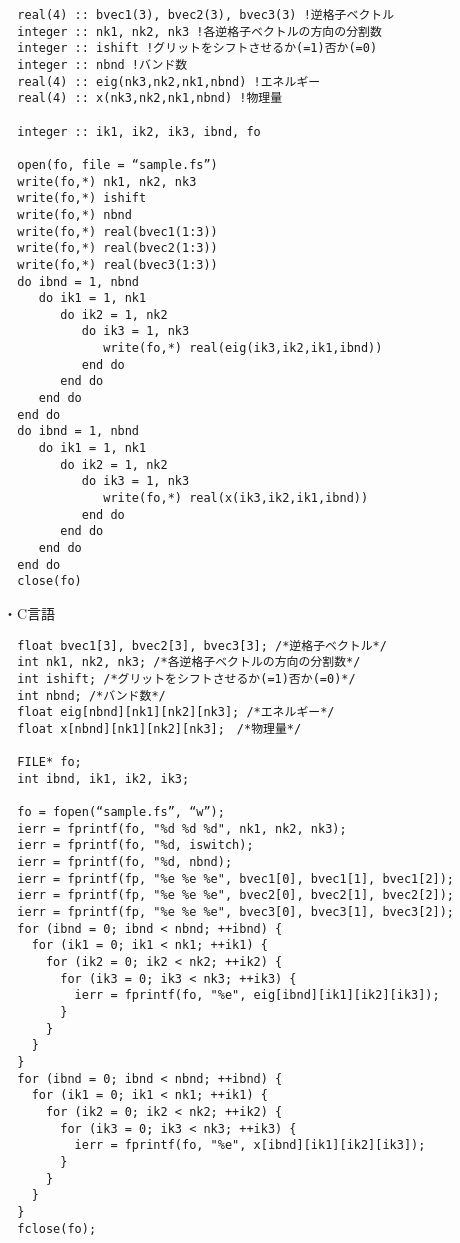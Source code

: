 \documentclass[12pt]{jarticle}
\begin{document}
\begin{verbatim}
  real(4) :: bvec1(3), bvec2(3), bvec3(3) !逆格子ベクトル
  integer :: nk1, nk2, nk3 !各逆格子ベクトルの方向の分割数
  integer :: ishift !グリットをシフトさせるか(=1)否か(=0)
  integer :: nbnd !バンド数
  real(4) :: eig(nk3,nk2,nk1,nbnd) !エネルギー
  real(4) :: x(nk3,nk2,nk1,nbnd) !物理量

  integer :: ik1, ik2, ik3, ibnd, fo

  open(fo, file = “sample.fs”)
  write(fo,*) nk1, nk2, nk3
  write(fo,*) ishift
  write(fo,*) nbnd
  write(fo,*) real(bvec1(1:3))
  write(fo,*) real(bvec2(1:3))
  write(fo,*) real(bvec3(1:3))
  do ibnd = 1, nbnd
     do ik1 = 1, nk1
        do ik2 = 1, nk2
           do ik3 = 1, nk3
              write(fo,*) real(eig(ik3,ik2,ik1,ibnd)) 
           end do
        end do
     end do
  end do
  do ibnd = 1, nbnd
     do ik1 = 1, nk1
        do ik2 = 1, nk2
           do ik3 = 1, nk3
              write(fo,*) real(x(ik3,ik2,ik1,ibnd)) 
           end do
        end do
     end do
  end do
  close(fo)
\end{verbatim}

・C言語

\begin{verbatim}
  float bvec1[3], bvec2[3], bvec3[3]; /*逆格子ベクトル*/
  int nk1, nk2, nk3; /*各逆格子ベクトルの方向の分割数*/
  int ishift; /*グリットをシフトさせるか(=1)否か(=0)*/
  int nbnd; /*バンド数*/
  float eig[nbnd][nk1][nk2][nk3]; /*エネルギー*/
  float x[nbnd][nk1][nk2][nk3];　/*物理量*/

  FILE* fo;
  int ibnd, ik1, ik2, ik3;

  fo = fopen(“sample.fs”, “w”);
  ierr = fprintf(fo, "%d %d %d", nk1, nk2, nk3);
  ierr = fprintf(fo, "%d, iswitch);
  ierr = fprintf(fo, "%d, nbnd);
  ierr = fprintf(fp, "%e %e %e", bvec1[0], bvec1[1], bvec1[2]); 
  ierr = fprintf(fp, "%e %e %e", bvec2[0], bvec2[1], bvec2[2]);
  ierr = fprintf(fp, "%e %e %e", bvec3[0], bvec3[1], bvec3[2]);
  for (ibnd = 0; ibnd < nbnd; ++ibnd) {  
    for (ik1 = 0; ik1 < nk1; ++ik1) { 
      for (ik2 = 0; ik2 < nk2; ++ik2) { 
        for (ik3 = 0; ik3 < nk3; ++ik3) { 
          ierr = fprintf(fo, "%e", eig[ibnd][ik1][ik2][ik3]); 
        } 
      } 
    } 
  } 
  for (ibnd = 0; ibnd < nbnd; ++ibnd) {  
    for (ik1 = 0; ik1 < nk1; ++ik1) { 
      for (ik2 = 0; ik2 < nk2; ++ik2) { 
        for (ik3 = 0; ik3 < nk3; ++ik3) { 
          ierr = fprintf(fo, "%e", x[ibnd][ik1][ik2][ik3]); 
        } 
      } 
    } 
  } 
  fclose(fo); 
\end{verbatim}
\end{document}
